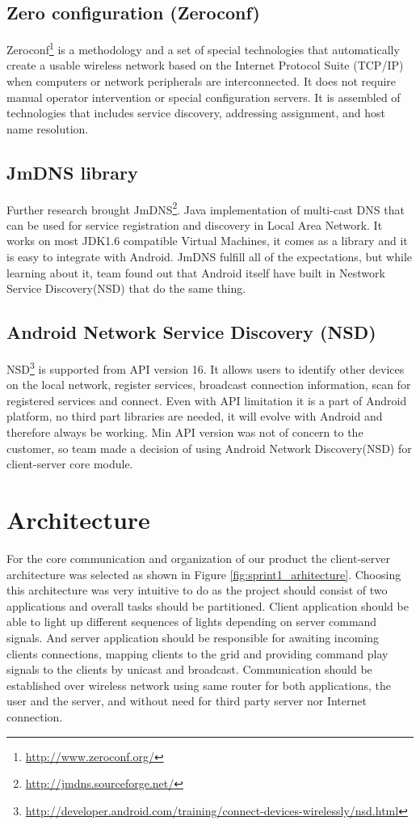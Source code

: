 \subsection {Zero configuration (Zeroconf)}
Zeroconf\footnote{\url{http://www.zeroconf.org/}} is a methodology and a set of special technologies that automatically create a usable wireless network based on the Internet Protocol Suite (TCP/IP) when computers or network peripherals are interconnected. 
It does not require manual operator intervention or special configuration servers.
It is assembled of technologies that includes service discovery, addressing assignment, and host name resolution.


\subsection{JmDNS library}
Further research brought JmDNS\footnote{\url{http://jmdns.sourceforge.net/}}. 
Java implementation of multi-cast DNS that can be used for service registration and discovery in Local Area Network. 
It works on most JDK1.6 compatible Virtual Machines, it comes as a library and it is easy to integrate with Android. 
JmDNS fulfill all of the expectations, but while learning about it, team found out that Android itself have built in Nestwork Service Discovery(NSD) that do the same thing.

\subsection{Android Network Service Discovery (NSD)}
NSD\footnote{\url{http://developer.android.com/training/connect-devices-wirelessly/nsd.html}} is supported from API version 16. 
It allows users to identify other devices on the local network, register services, broadcast connection information, scan for registered services and connect.
Even with API limitation it is a part of Android platform, no third part libraries are needed, it will evolve with Android and therefore always be working.
Min API version was not of concern to the customer, so team made a decision of using Android Network Discovery(NSD) for client-server core module.

\section{Architecture}
For the core communication and organization of our product the client-server architecture was selected as shown in Figure \ref{fig:sprint1_arhitecture}.
Choosing this architecture was very intuitive to do as the project should consist of two applications and overall tasks should be partitioned. 
Client application should be able to light up different sequences of lights depending on server command signals.
And server application should be responsible for awaiting incoming clients connections, mapping clients to the grid and providing command play signals to the clients by unicast and broadcast.
Communication should be established over wireless network using same router for both applications, the user and the server, and without need for third party server nor Internet connection.

